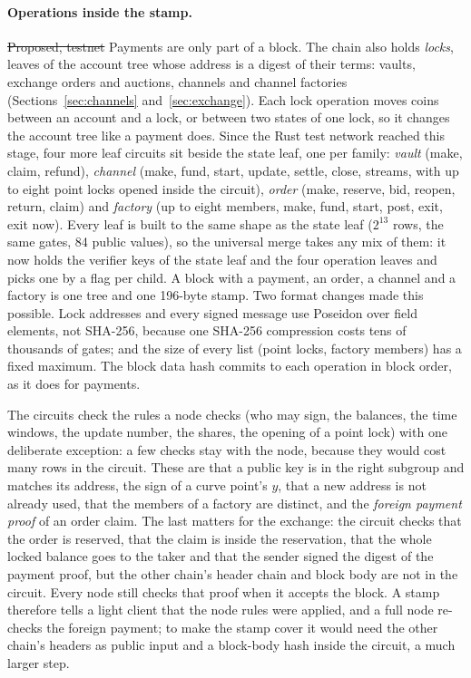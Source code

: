 \paragraph{Operations inside the stamp.} \st{Proposed, testnet} Payments are only part of a block. The chain also holds \emph{locks}, leaves of the account tree whose address is a digest of their terms: vaults, exchange orders and auctions, channels and channel factories (Sections~\ref{sec:channels} and~\ref{sec:exchange}). Each lock operation moves coins between an account and a lock, or between two states of one lock, so it changes the account tree like a payment does. Since the Rust test network reached this stage, four more leaf circuits sit beside the state leaf, one per family: \emph{vault} (make, claim, refund), \emph{channel} (make, fund, start, update, settle, close, streams, with up to eight point locks opened inside the circuit), \emph{order} (make, reserve, bid, reopen, return, claim) and \emph{factory} (up to eight members, make, fund, start, post, exit, exit now). Every leaf is built to the same shape as the state leaf ($2^{13}$ rows, the same gates, 84 public values), so the universal merge takes any mix of them: it now holds the verifier keys of the state leaf and the four operation leaves and picks one by a flag per child. A block with a payment, an order, a channel and a factory is one tree and one 196-byte stamp. Two format changes made this possible. Lock addresses and every signed message use Poseidon over field elements, not SHA-256, because one SHA-256 compression costs tens of thousands of gates; and the size of every list (point locks, factory members) has a fixed maximum. The block data hash commits to each operation in block order, as it does for payments.

The circuits check the rules a node checks (who may sign, the balances, the time windows, the update number, the shares, the opening of a point lock) with one deliberate exception: a few checks stay with the node, because they would cost many rows in the circuit. These are that a public key is in the right subgroup and matches its address, the sign of a curve point's $y$, that a new address is not already used, that the members of a factory are distinct, and the \emph{foreign payment proof} of an order claim. The last matters for the exchange: the circuit checks that the order is reserved, that the claim is inside the reservation, that the whole locked balance goes to the taker and that the sender signed the digest of the payment proof, but the other chain's header chain and block body are not in the circuit. Every node still checks that proof when it accepts the block. A stamp therefore tells a light client that the node rules were applied, and a full node re-checks the foreign payment; to make the stamp cover it would need the other chain's headers as public input and a block-body hash inside the circuit, a much larger step.

